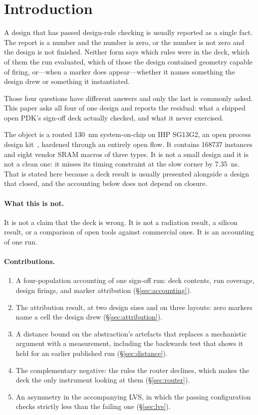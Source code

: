 \documentclass[11pt,a4paper]{article}
\begin{document}
\section{Introduction}
\label{sec:intro}

A design that has passed design-rule checking is usually reported as a
single fact. The report is a number and the number is zero, or the
number is not zero and the design is not finished. Neither form says
which rules were in the deck, which of them the run evaluated, which of
those the design contained geometry capable of firing, or---when a
marker does appear---whether it names something the design drew or
something it instantiated.

Those four questions have different answers and only the last is
commonly asked. This paper asks all four of one design and reports the
residual: what a shipped open PDK's sign-off deck actually checked, and
what it never exercised.

The object is a routed \SI{130}{\nano\meter} system-on-chip on IHP
SG13G2, an open process design kit~\cite{ihppdk}, hardened through an entirely open
flow. It contains \num{168737} instances and eight vendor SRAM macros of
three types. It is not a small design and it is not a clean one: it
misses its timing constraint at the slow corner by
\SI{7.35}{\nano\second}. That is stated here because a deck result is
usually presented alongside a design that closed, and the accounting
below does not depend on closure.

\paragraph{What this is not.} It is not a claim that the deck is wrong.
It is not a radiation result, a silicon result, or a comparison of open
tools against commercial ones. It is an accounting of one run.

\paragraph{Contributions.}
\begin{enumerate}
\item A four-population accounting of one sign-off run: deck contents,
  run coverage, design firings, and marker attribution
  (\S\ref{sec:accounting}).
\item The attribution result, at two design sizes and on three layouts:
  zero markers name a cell the design drew (\S\ref{sec:attribution}).
\item A distance bound on the abstraction's artefacts that replaces a
  mechanistic argument with a measurement, including the backwards test
  that shows it held for an earlier published run (\S\ref{sec:distance}).
\item The complementary negative: the rules the router declines, which
  makes the deck the only instrument looking at them
  (\S\ref{sec:router}).
\item An asymmetry in the accompanying LVS, in which the passing
  configuration checks strictly less than the failing one
  (\S\ref{sec:lvs}).
\end{enumerate}
\end{document}
